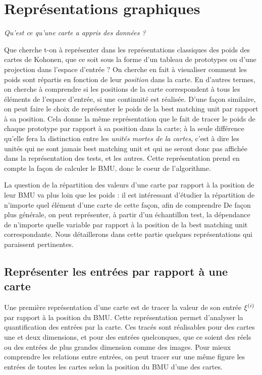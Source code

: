 \section{Représentations graphiques}

\emph{Qu'est ce qu'une carte a appris des données ?}

Que cherche t-on à représenter dans les représentations classiques des poids des cartes de Kohonen, que ce soit sous la forme d'un tableau de prototypes ou d'une projection dans l'espace d'entrée ? On cherche en fait à visualiser comment les poids sont répartis en fonction de leur \emph{position} dans la carte. En d'autres termes, on cherche à comprendre si les positions de la carte correspondent à tous les éléments de l'espace d'entrée, si une continuité est réalisée. 
D'une façon similaire, on peut faire le choix de représenter le poids de la best matching unit par rapport à sa position. Cela donne la même représentation que le fait de tracer le poids de chaque prototype par rapport à sa position dans la carte; à la seule différence qu'elle fera la distinction entre les \emph{unités mortes de la cartes}, c'est à dire les unités qui ne sont jamais best matching unit et qui ne seront donc pas affichée dans la représentation des tests, et les autres.
Cette représentation prend en compte la façon de calculer le BMU, donc le coeur de l'algorithme.

La question de la répartition des valeurs d'une carte par rapport à la position de leur BMU va plus loin que les poids : il est intéressant d'étudier la répartition de n'importe quel élément d'une carte de cette façon, afin de comprendre 
De façon plus générale, on peut représenter, à partir d'un échantillon test, la dépendance de n'importe quelle variable par rapport à la position de la best matching unit correspondante. Nous détaillerons dans cette partie quelques représentations qui paraissent pertinentes.


\subsection{Représenter les entrées par rapport à une carte}

Une première représentation d'une carte est de tracer la valeur de son entrée $\xi^{({i})}$ par rapport à la position du BMU. Cette représentation permet d'analyser la quantification des entrées par la carte. Ces tracés sont réalisables pour des cartes une et deux dimensions, et pour des entrées quelconques, que ce soient des réels ou des entrées de plus grandes dimension comme des images.
Pour mieux comprendre les relations entre entrées, on peut tracer sur une même figure les entrées de toutes les cartes selon la position du BMU d'une des cartes. 

